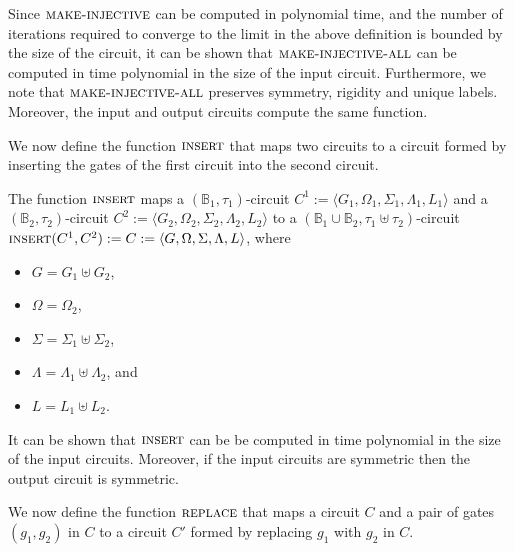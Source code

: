 \documentclass[../paper.tex]{subfiles}
\begin{document}
Since ${\normalfont\textsc{make-injective}}$ can be computed in polynomial time, and the number
of iterations required to converge to the limit in the above definition is
bounded by the size of the circuit, it can be shown that
${\normalfont\textsc{make-injective-all}}$ can be computed in time polynomial in the size of the
input circuit. Furthermore, we note that ${\normalfont\textsc{make-injective-all}}$ preserves
symmetry, rigidity and unique labels. Moreover, the input and output circuits
compute the same function.

We now define the function ${\normalfont\textsc{insert}}$ that maps two circuits to a circuit
formed by inserting the gates of the first circuit into the second circuit.

\begin{definition}
  The function ${\normalfont\textsc{insert}}$ maps a $(\mathbb{B}_1, \tau_1)$-circuit $C^1 :=
  \langle G_1, \Omega_1, \Sigma_1 , \Lambda_1, L_1 \rangle$ and a
  $(\mathbb{B}_2, \tau_2)$-circuit $C^2 := \langle G_2, \Omega_2, \Sigma_2 ,
  \Lambda_2, L_2 \rangle$ to a $(\mathbb{B}_1 \cup \mathbb{B}_2, \tau_1 \uplus
  \tau_2)$-circuit ${\normalfont\textsc{insert}}(C^1, C^2) := C := \langle G, \Omega, \Sigma ,
  \Lambda, L \rangle$, where
  \begin{itemize}
    \setlength\itemsep{0mm}
  \item $G = G_1 \uplus G_2$,
  \item $\Omega = \Omega_2$,
  \item $\Sigma = \Sigma_1 \uplus \Sigma_2$,
  \item $\Lambda = \Lambda_1 \uplus \Lambda_2$, and
  \item $L = L_1 \uplus L_2$.
  \end{itemize}
\end{definition}

It can be shown that ${\normalfont\textsc{insert}}$ can be be computed in time polynomial in the
size of the input circuits. Moreover, if the input circuits are symmetric then
the output circuit is symmetric.

We now define the function ${\normalfont\textsc{replace}}$ that maps a circuit $C$ and a pair of
gates $(g_1, g_2)$ in $C$ to a circuit $C'$ formed by replacing $g_1$ with $g_2$
in $C$.
\end{document}

